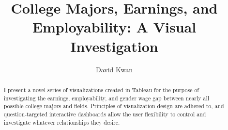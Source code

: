 \documentclass[sigchi]{acmart}
\begin{document}
\title{College Majors, Earnings, and Employability: A Visual Investigation}

\author{David Kwan}


\begin{abstract}
 I present a novel series of visualizations created in Tableau for the purpose of investigating the earnings, employability, and gender wage gap between nearly all possible college majors and fields. Principles of visualization design are adhered to, and question-targeted interactive dashboards allow the user flexibility to control and investigate whatever relationships they desire. 
\end{abstract}

\end{document}
